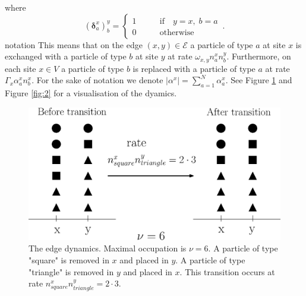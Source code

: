 \documentclass[11pt]{article}
\numberwithin{equation}{section}
\numberwithin{equation}{subsection}
\begin{document}
where 
\begin{equation}
(\bm{\delta}_{a}^{x})^{y}_{b}=\begin{cases}
1\qquad &\text{if}\quad y=x,\;b=a\\
0\qquad &\text{otherwise}
\end{cases}\,.
\end{equation}
{\color{red} notation}
This means that on the edge $(x,y)\in \mathcal{E}$  a particle of type $a$ at site $x$ is exchanged with a particle of type $b$ at site $y$ at rate $\omega_{x,y}n_{a}^{x}n_{b}^{y}$. Furthermore, on each site $x\in V$  a particle of type $b$ is replaced with a particle of type $a$ at rate $\Gamma_{x}\alpha_{a}^{x}n_{b}^{x}$. For the sake of notation we denote $|\alpha^{x}|=\sum_{a=1}^{N}\alpha_{a}^{x}$. 
See Figure \ref{fig:1} and  Figure \ref{fig:2} for a visualisation of the dyamics. 
\begin{figure}
    \centering
    \includegraphics[scale=0.45]{BulkStirring.eps}
    \caption{The edge dynamics. Maximal occupation is $\nu=6$. A particle of type "square" is removed in $x$ and placed in $y$. A particle of type "triangle" is removed in $y$ and placed in $x$. This transition occurs at rate $n_{square}^{x}n_{triangle}^{y}=2\cdot 3$.}
    \label{fig:1}
\end{figure}
\end{document}
